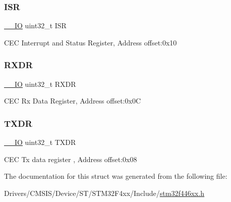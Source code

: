 \subsubsection{\texorpdfstring{I\+SR}{ISR}}
{\footnotesize\ttfamily \mbox{\hyperlink{core__sc300_8h_aec43007d9998a0a0e01faede4133d6be}{\+\_\+\+\_\+\+IO}} uint32\+\_\+t I\+SR}

C\+EC Interrupt and Status Register, Address offset\+:0x10 \mbox{\label{struct_c_e_c___type_def_a9bf29a9104cb5569823ab892174f9c8c}} 
\subsubsection{\texorpdfstring{R\+X\+DR}{RXDR}}
{\footnotesize\ttfamily \mbox{\hyperlink{core__sc300_8h_aec43007d9998a0a0e01faede4133d6be}{\+\_\+\+\_\+\+IO}} uint32\+\_\+t R\+X\+DR}

C\+EC Rx Data Register, Address offset\+:0x0C \mbox{\label{struct_c_e_c___type_def_ad7e8d785fff2acfeb8814e43bda8dd72}} 
\subsubsection{\texorpdfstring{T\+X\+DR}{TXDR}}
{\footnotesize\ttfamily \mbox{\hyperlink{core__sc300_8h_aec43007d9998a0a0e01faede4133d6be}{\+\_\+\+\_\+\+IO}} uint32\+\_\+t T\+X\+DR}

C\+EC Tx data register , Address offset\+:0x08 

The documentation for this struct was generated from the following file\+:\begin{DoxyCompactItemize}
\item 
Drivers/\+C\+M\+S\+I\+S/\+Device/\+S\+T/\+S\+T\+M32\+F4xx/\+Include/\mbox{\hyperlink{stm32f446xx_8h}{stm32f446xx.\+h}}\end{DoxyCompactItemize}

